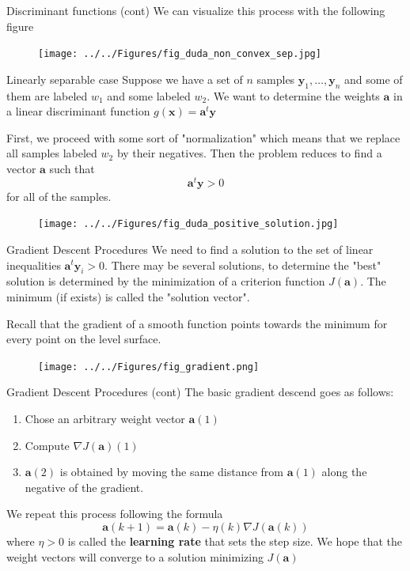 \documentclass{beamer}
\begin{document}
\begin{frame}{Discriminant functions (cont)}
	We can visualize this process with the following figure
	\begin{figure}
		\centering
		\texttt{[image: ../../Figures/fig\_duda\_non\_convex\_sep.jpg]}
	\end{figure}
\end{frame}
\begin{frame}{Linearly separable case }
	Suppose we have a set of $n$ samples $\mathbf{y}_1,\ldots,\mathbf{y}_n$ and some of them are labeled $w_1$ and some labeled $w_2$. We want to determine the weights $\mathbf{a}$ in a linear discriminant function $g(\mathbf{x})=\mathbf{a}^t \mathbf{y}$
	
	First, we proceed with some sort of "normalization" which means that we replace all samples labeled $w_2$ by their negatives. Then the problem reduces to find a vector $\mathbf{a}$ such that 
	\begin{equation*}
		\mathbf{a}^t \mathbf y > 0
	\end{equation*}
for all of the samples. 

\begin{figure}
	\centering
	\texttt{[image: ../../Figures/fig\_duda\_positive\_solution.jpg]}
\end{figure}
\end{frame}

\begin{frame}{Gradient Descent Procedures}
		We need to find a solution to the set of linear inequalities $\mathbf{a}^t\mathbf{y}_i >0$. There may be several solutions, to determine the "best" solution is determined by the minimization of a criterion function $J(\mathbf{a})$.  The minimum (if exists) is called the "solution vector".

Recall that the gradient of a smooth function points towards the minimum for every point on the level surface.

\begin{figure}
	\centering
	\texttt{[image: ../../Figures/fig\_gradient.png]}
\end{figure}
\end{frame}

\begin{frame}{Gradient Descent Procedures (cont)}	
	The basic gradient descend goes as follows:
	
	\begin{enumerate}
		\item Chose an arbitrary weight vector $\mathbf{a}(1)$ 
		\item Compute $\nabla J (\mathbf{a})(1)$
		\item $\mathbf{a}(2)$ is obtained by moving the same distance from $\mathbf{a}(1)$ along the negative of the gradient.
	\end{enumerate}
We repeat this process following the formula
\begin{equation*}
	\mathbf{a}(k+1)= \mathbf{a}(k) -\eta(k) \nabla J (\mathbf{a}(k))
\end{equation*}
where $\eta >0 $ is called the {\bf learning rate } that sets the step size. We hope that the weight vectors will converge to a solution minimizing $J(\mathbf{a})$
\end{frame}
\end{document}
